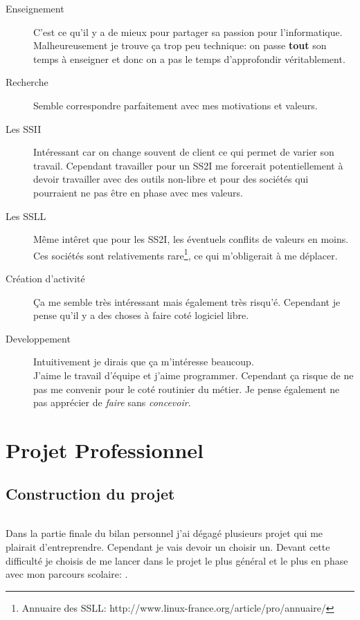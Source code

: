 \documentclass[a4paper,12pt, draft]{report}
\newcommand{\tabTitle}[1]{\hfill{} \textsc{#1} \hfill{} }
\begin{document}
\begin{description}
\item [Enseignement] C'est ce qu'il y a de mieux pour partager sa passion pour l'informatique. Malheureusement je trouve ça trop peu technique: on passe \textbf{tout} son temps à enseigner et donc on a pas le temps d'approfondir véritablement.

\item [Recherche] Semble correspondre parfaitement avec mes motivations et valeurs.

\item [Les SSII] Intéressant car on change souvent de client ce qui permet de varier son travail. Cependant travailler pour un SS2I me forcerait potentiellement à devoir travailler avec des outils non-libre et pour des sociétés qui pourraient ne pas être en phase avec mes valeurs.

\item [Les SSLL] Même intêret que pour les SS2I, les éventuels conflits de valeurs en moins. Ces sociétés sont relativements rare\footnote{Annuaire des SSLL: http://www.linux-france.org/article/pro/annuaire/}, ce qui m'obligerait à me déplacer.
 
\item [Création d'activité] Ça me semble très intéressant mais également très risqu'é. Cependant je pense qu'il y a des choses à faire coté logiciel libre.

\item [Developpement] Intuitivement je dirais que ça m'intéresse beaucoup. \\J'aime le travail d'équipe et j'aime programmer. Cependant ça risque de ne pas me convenir pour le coté routinier du métier. Je pense également ne pas apprécier de \textit{faire} sans \textit{concevoir}.
\end{description}


\part{Projet Professionnel}

\chapter{Construction du projet}
\paragraph{}
Dans la partie finale du bilan personnel j'ai dégagé plusieurs projet qui me plairait d'entreprendre. Cependant je vais devoir un choisir un. Devant cette difficulté je choisis de me lancer dans le projet le plus général et le plus en phase avec mon parcours scolaire: \tabTitle{}. \\
\end{document}
